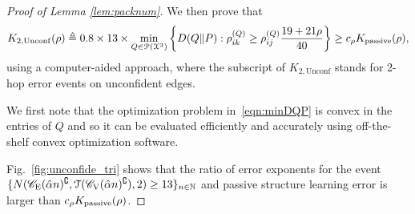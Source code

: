 \begin{proof}[Proof of Lemma \ref{lem:packnum}]
	We then prove that
	\begin{align}
    	K_{2,\mathrm{Unconf}}(\rho)\triangleq 0.8\times13\times\min_{Q\in\mathcal{P}(\mathcal{X}^{3})}\bigg\{D(Q\|P):\rho_{ik}^{(Q)}\geq\rho_{ij}^{(Q)}\frac{19+21\rho}{40}\bigg\}\geq c_{\rho}K _{{\rm passive}}(\rho), \label{eqn:minDQP}
	\end{align}
	using a computer-aided approach, where the subscript of $K_{2,\mathrm{Unconf}}$ stands for 2-hop error events on unconfident edges.
	
	We first note that the optimization problem in~\eqref{eqn:minDQP} is  convex in the entries of $Q$ and so it can be evaluated efficiently and accurately using off-the-shelf convex optimization software. %
	
	Fig.~\ref{fig:unconfide_tri} shows that the ratio of error exponents for the event $\{N(\mathscr{C}_{\mathrm{E}}(\hat{\alpha} n)^{\complement},\mathcal{T}(\mathscr{C}_{\mathrm{V}}(\hat{\alpha} n)^{\complement}),2)\geq 13\}_{n\in\mathbb{N}}$ and passive structure learning error is larger than $c_{\rho}K _{{\rm passive}}(\rho)$.
\end{proof}

